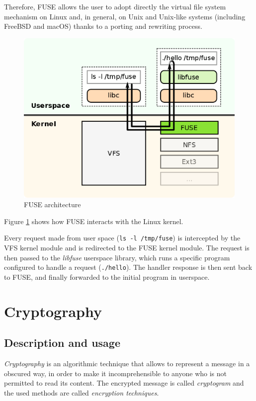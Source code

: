 \documentclass[a4paper,12pt,twoside,openright]{report}
\begin{document}
  Therefore, FUSE allows the user to adopt directly the virtual file system mechanism on Linux and,
  in general, on Unix and Unix-like systems (including FreeBSD and macOS) thanks to a porting and rewriting process.

  \begin{figure}[h!]
    \centering
    \includegraphics[width=0.6\linewidth]{images/fuse_structure.png}
    \caption{FUSE architecture}
    \label{fig:fuse-structure}
  \end{figure}

  Figure \ref{fig:fuse-structure} shows how FUSE interacts with the Linux kernel.
  
  Every request made from user space (\texttt{ls -l /tmp/fuse}) is intercepted by
  the VFS kernel module\footnotemark{} and is redirected to the FUSE kernel module.
  The request is then passed to the \textit{libfuse} userspace library, which runs a specific
  program configured to handle a request (\texttt{./hello}).
  The handler response is then sent back to FUSE, and finally forwarded to the initial program in userspace.


  \section{Cryptography}

  \subsection{Description and usage}

  \textit{Cryptography} is an algorithmic technique that allows to represent a message in a obscured way,
  in order to make it incomprehensible to anyone who is not permitted to read its content.
  The encrypted message is called \textit{cryptogram} and the used methods are called \textit{encryption techniques}.
\end{document}
